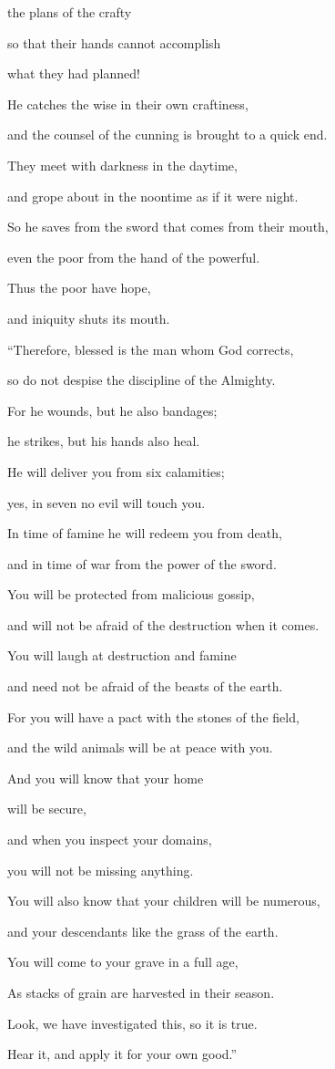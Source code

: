 {the plans
of the crafty
\par }{\Q so that their hands
cannot
accomplish
\par }{\Q what they had planned!
\par }{\Q {}He catches
the wise
in their own craftiness,
\par }{\Q and the counsel
of the cunning is
brought to a quick end.
\par }{\Q {}They meet
with darkness
in the daytime,
\par }{\Q and grope
about in the noontime
as if it were night.
\par }{\Q {}So he saves
from the sword
that comes from their mouth,
\par }{\Q even the poor
from the hand
of the powerful.
\par }{\Q {}Thus
the poor
have hope,
\par }{\Q and iniquity
shuts
its mouth.
\par }{\Q {}“Therefore, blessed
is the man
whom God
corrects,
\par }{\Q so do not
despise
the discipline
of the Almighty.
\par }{\Q {}For
he wounds, but he also bandages;
\par }{\Q he strikes,
but his hands
also heal.
\par }{\Q {}He will deliver
you from
six
calamities;
\par }{\Q yes, in seven
no
evil
will touch you.
\par }{\Q {}In time of famine
he will redeem
you from death,
\par }{\Q and in time of war
from the power
of the sword.
\par }{\Q {}You will be protected
from malicious
gossip,
\par }{\Q and will not
be afraid
of the destruction
when
it comes.
\par }{\Q {}You will laugh at
destruction
and famine
\par }{\Q and need not
be afraid
of the beasts
of the earth.
\par }{\Q {}For
you
will have a pact
with
the stones
of the field,
\par }{\Q and the wild
animals
will be at peace
with you.
\par }{\Q {}And you will know
that
your home
\par }{\Q will be secure,

\par }{\Q and when you inspect
your domains,
\par }{\Q you will not
be missing anything.
\par }{\Q {}You will also know
that
your children
will be numerous,
\par }{\Q and your descendants
like the grass
of the earth.
\par }{\Q {}You will come
to
your grave
in a full age,
\par }{\Q As stacks of grain
are harvested in their season.
\par }{\Q {}Look,
we have investigated
this, so
it is true.
\par }{\Q Hear
it, and apply it for your own good.”

}
